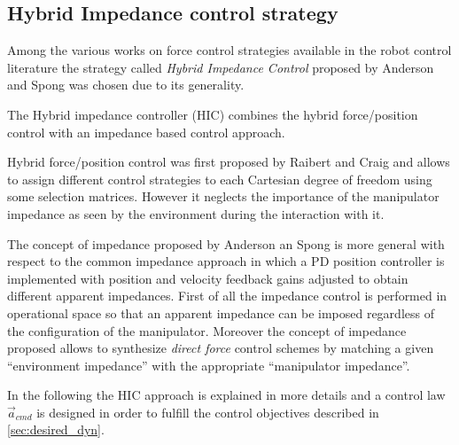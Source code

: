\subsection{Hybrid Impedance control strategy}
Among the various works on force control strategies available in the robot control
literature the strategy called \emph{Hybrid Impedance Control} proposed by Anderson and Spong
\cite{Anderson1988} was chosen due to its generality.
\par
The Hybrid impedance controller (HIC) combines the hybrid force/position control
with an impedance based control approach.
\par
Hybrid force/position control was first proposed by Raibert and Craig \cite{Raibert1981} and
allows to assign different control strategies to each 
Cartesian degree of freedom using some selection matrices. However it neglects the
importance of the manipulator impedance as seen by the environment during the interaction with it.
\par
The concept of impedance proposed by Anderson an Spong is more general with respect to the common
impedance approach in which a PD position controller is implemented with position and velocity
feedback gains adjusted to obtain different apparent impedances. First of all the
impedance control is performed in operational space so that an apparent impedance can be imposed
regardless of the configuration of the manipulator. Moreover the concept of impedance proposed
allows to synthesize \emph{direct force} control schemes by matching a given ``environment impedance''
with the appropriate ``manipulator impedance''.
\par
In the following the HIC approach is explained in more details
and a control law $\vec{a}_{cmd}$ is designed in order to fulfill
the control objectives described in \ref{sec:desired_dyn}.


